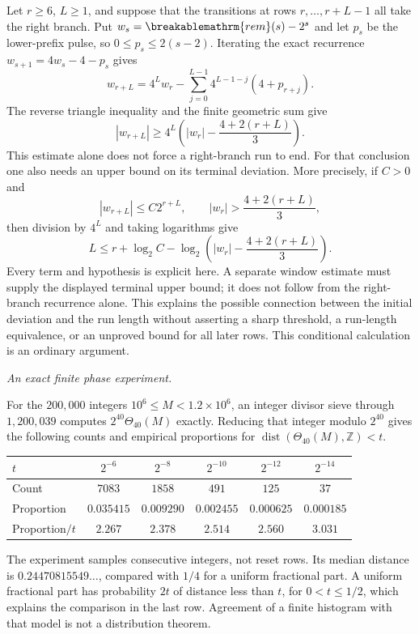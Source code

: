 \documentclass[11pt]{article}
\theoremstyle{plain}
\theoremstyle{definition}
\theoremstyle{remark}
\renewcommand{\mathrm}[1]{\ifmmode\breakablemathrm{#1}\else\textrm{#1}\fi}%
\begin{document}
Let $r\ge6$, $L\ge1$, and suppose that the transitions at rows
$r,\ldots,r+L-1$ all take the right branch.  Put
$w_s=\mathrm{rem}(s)-2^s$ and let $p_s$ be the lower-prefix
pulse, so $0\le p_s\le2(s-2)$.  Iterating the exact recurrence
$w_{s+1}=4w_s-4-p_s$ gives
\[
 w_{r+L}=4^Lw_r-
       \sum_{j=0}^{L-1}4^{L-1-j}(4+p_{r+j}).
\]
The reverse triangle inequality and the finite geometric sum give
\[
 |w_{r+L}|
 \ge4^L\left(|w_r|-\frac{4+2(r+L)}3\right).
\]
This estimate alone does not force a right-branch run to end.
For that conclusion one also needs an upper bound on its terminal
deviation.  More precisely, if $C>0$ and
\[
 |w_{r+L}|\le C2^{r+L},\qquad
 |w_r|>\frac{4+2(r+L)}3,
\]
then division by $4^L$ and taking logarithms give
\[
 L\le r+\log_2 C-
 \log_2\left(|w_r|-\frac{4+2(r+L)}3\right).
\]
Every term and hypothesis is explicit here.  A separate window
estimate must supply the displayed terminal upper bound; it does
not follow from the right-branch recurrence alone.  This explains
the possible connection between the initial deviation and the
run length without asserting a sharp threshold, a run-length
equivalence, or an unproved bound for all later rows.  This conditional
calculation is an ordinary argument.

\emph{An exact finite phase experiment.}

For the $200{,}000$ integers $10^6\le M<1.2\times10^6$, an
integer divisor sieve through $1{,}200{,}039$ computes
$2^{40}\Theta_{40}(M)$ exactly.  Reducing that integer modulo
$2^{40}$ gives the following counts and empirical proportions for
$\operatorname{dist}(\Theta_{40}(M),\mathbb Z)<t$.
\begin{center}
\begin{tabular}{lccccc}
\hline
$t$ & $2^{-6}$ & $2^{-8}$ & $2^{-10}$ & $2^{-12}$ & $2^{-14}$\\
\hline
Count & $7083$ & $1858$ & $491$ & $125$ & $37$\\
Proportion & $0.035415$ & $0.009290$ & $0.002455$ & $0.000625$ & $0.000185$\\
Proportion$/t$ & $2.267$ & $2.378$ & $2.514$ & $2.560$ & $3.031$\\
\hline
\end{tabular}
\end{center}
The experiment samples consecutive integers, not reset rows.  Its median distance
is $0.24470815549\ldots$, compared with $1/4$ for a uniform
fractional part.  A uniform fractional part has probability $2t$
of distance less than $t$, for $0<t\le1/2$, which explains the
comparison in the last row.  Agreement of a finite histogram with
that model is not a distribution theorem.
\end{document}
